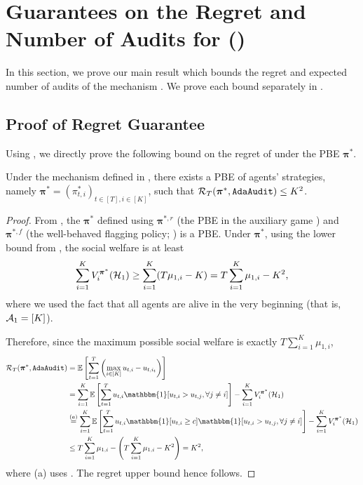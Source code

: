 \section{Guarantees on the Regret and Number of Audits for \mechname ()}\label{sec:appendix varying-p-audits}

In this section, we prove our main result  which bounds the regret and expected number of audits of the mechanism \mechname. We prove each bound separately in .

\subsection{Proof of Regret Guarantee}\label{subsec:proof_regret}

Using , we directly prove the following bound on the regret of \mechname under the PBE $\bm\pi^\ast$.

\begin{theorem}\label{thm:regret main theorem formal}
Under the mechanism \mechname defined in , there exists a PBE of agents' strategies, namely $\bm \pi^\ast=(\pi_{t,i}^\ast)_{t\in [T],i\in [K]}$, such that
$\mathcal R_T(\bm \pi^\ast,\texttt{AdaAudit})\le K^2$.
\end{theorem}
\begin{proof}
From , the $\bm \pi^\ast$ defined using ${\bm \pi}^{\ast,r}$ (the PBE in the auxiliary game ) and ${\bm \pi}^{\ast,f}$ (the well-behaved flagging policy; ) is a PBE.
Under ${\bm \pi}^\ast$, using the lower bound  from , the social welfare is at least
\begin{equation*}
\sum_{i=1}^K V_i^{{\bm \pi}^\ast}(\mathcal{H}_1)\ge \sum_{i=1}^K (T\mu_{1,i}-K)=T\sum_{i=1}^K \mu_{1,i}-K^2,
\end{equation*}
where we used the fact that all agents are alive in the very beginning (that is, $\mathcal{A}_1=[K]$).

Therefore, since the maximum possible social welfare is exactly $T\sum_{i=1}^K \mu_{1,i}$,
\begin{align*}
\mathcal R_T(\bm \pi^
\ast,\mechname)&=\E \left [\sum_{t=1}^T \left (\max_{i\in [K]} u_{t,i}-u_{t,i_t}\right )\right ]\\
&=\sum_{i=1}^K \E\left [\sum_{t=1}^T u_{t,i}\mathbbm{1}[u_{t,i}>u_{t,j},\forall j\ne i]\right ]-\sum_{i=1}^K V_i^{{\bm \pi}^\ast}(\mH_1)\\
&\overset{(a)}{=}\sum_{i=1}^K \E\left [\sum_{t=1}^T u_{t,i} \mathbbm{1}[u_{t,i}\ge c] \mathbbm{1}[u_{t,i}>u_{t,j},\forall j\ne i]\right ]-\sum_{i=1}^K V_i^{{\bm \pi}^\ast}(\mH_1)\\
&\le T\sum_{i=1}^K \mu_{1,i}-\left (T\sum_{i=1}^K \mu_{1,i}-K^2\right )=K^2,
\end{align*}
where (a) uses . The regret upper bound hence follows.
\end{proof}

